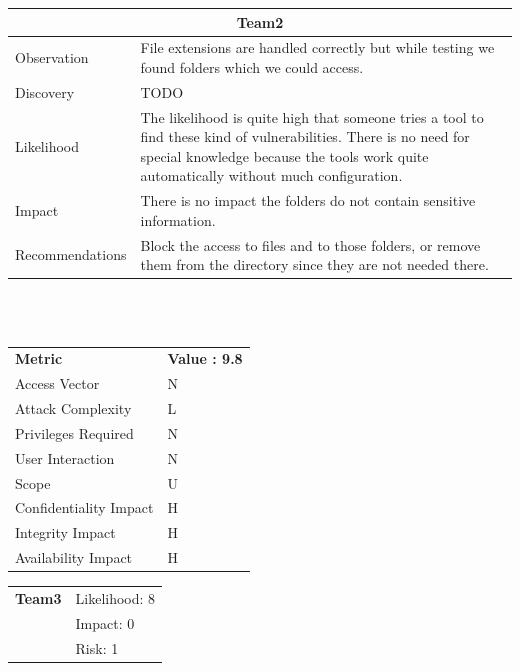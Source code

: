 \documentclass[headsepline,footsepline,footinclude=false,oneside,fontsize=11pt,paper=a4,listof=totoc,bibliography=totoc]{scrbook} %
\begin{document}
\begin{tabular}{ l|p{11cm}  }
	\hline
	\multicolumn{2}{c}{\textbf{Team2}} \\
	\hline
	Observation   & File extensions are handled correctly but while testing we found folders which we could access.   \\
	Discovery  & TODO \\
	Likelihood & The likelihood is quite high that someone tries a tool to find these kind of vulnerabilities. There is no need for special knowledge because the tools work quite automatically without much configuration. \\
	Impact    & There is no impact the folders do not contain sensitive information.\\
	Recommendations & Block the access to files and to those folders, or remove them from the directory since they are not needed there.\\ 
	\hline
\end{tabular}
\\
\vspace{0.5cm}
\\
\begin{center}
	\begin{tabular}{ll}
		\rowcolor[HTML]{34CDF9}
		{\color[HTML]{ECF4FF} \textbf{Metric}}        & {\color[HTML]{ECF4FF} \textbf{Value : 9.8}} \\
		\rowcolor[HTML]{BBDAFF}
		{\color[HTML]{333333} Access Vector}          & {\color[HTML]{333333} } N              \\
		\rowcolor[HTML]{ECF4FF}
		{\color[HTML]{333333} Attack Complexity}      & {\color[HTML]{333333} } L              \\
		\rowcolor[HTML]{BBDAFF}
		{\color[HTML]{333333} Privileges Required}    & {\color[HTML]{333333} } N              \\
		\rowcolor[HTML]{ECF4FF}
		{\color[HTML]{333333} User Interaction}       & {\color[HTML]{333333} } N              \\
		\rowcolor[HTML]{BBDAFF}
		{\color[HTML]{333333} Scope}                  & {\color[HTML]{333333} } U              \\
		\rowcolor[HTML]{ECF4FF}
		{\color[HTML]{333333} Confidentiality Impact} & {\color[HTML]{333333} } H              \\
		\rowcolor[HTML]{BBDAFF}
		{\color[HTML]{333333} Integrity Impact}       & {\color[HTML]{333333} } H              \\
		\rowcolor[HTML]{ECF4FF}
		{\color[HTML]{333333} Availability Impact}    & {\color[HTML]{333333} } H
	\end{tabular}
\end{center}
\begin{tabular}{cR{12cm}}
	\textbf{Team3} & Likelihood: 8\\& Impact: 0\\& Risk: 1
\end{tabular}
\end{document}
